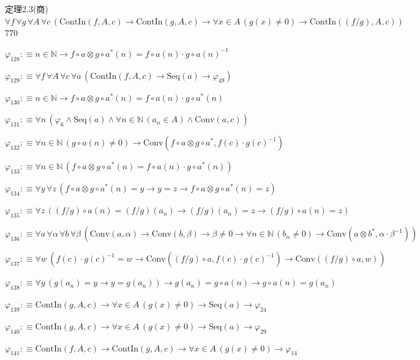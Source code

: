 \begin{fullproof}{定理2.3(商)}{$\forall f\,\forall g\,\forall A\,\forall c\,(\mathrm{ContIn}(f,A,c) \to \mathrm{ContIn}(g,A,c) \to \forall x \in A\,(g(x) \neq 0) \to \mathrm{ContIn}((f / g),A,c))$}{770}
\begin{abbrevlist}
\item $\varphi_{128} :\equiv n \in \mathbb{N} \to f \circ a \otimes g \circ a^{\ast}(n) = f \circ a(n) \cdot g \circ a(n)^{-1}$
\item $\varphi_{129} :\equiv \forall f\,\forall A\,\forall c\,\forall a\,(\mathrm{ContIn}(f,A,c) \to \mathrm{Seq}(a) \to \varphi_{49})$
\item $\varphi_{130} :\equiv n \in \mathbb{N} \to f \circ a \otimes g \circ a^{\ast}(n) = f \circ a(n) \cdot g \circ a^{\ast}(n)$
\item $\varphi_{131} :\equiv \forall n\,(\varphi_{6} \land \mathrm{Seq}(a) \land \forall n \in \mathbb{N}\,(a_{n} \in A) \land \mathrm{Conv}(a,c))$
\item $\varphi_{132} :\equiv \forall n \in \mathbb{N}\,(g \circ a(n) \neq 0) \to \mathrm{Conv}(f \circ a \otimes g \circ a^{\ast},f(c) \cdot g(c)^{-1})$
\item $\varphi_{133} :\equiv \forall n \in \mathbb{N}\,(f \circ a \otimes g \circ a^{\ast}(n) = f \circ a(n) \cdot g \circ a^{\ast}(n))$
\item $\varphi_{134} :\equiv \forall y\,\forall z\,(f \circ a \otimes g \circ a^{\ast}(n) = y \to y = z \to f \circ a \otimes g \circ a^{\ast}(n) = z)$
\item $\varphi_{135} :\equiv \forall z\,((f / g) \circ a(n) = (f / g)(a_{n}) \to (f / g)(a_{n}) = z \to (f / g) \circ a(n) = z)$
\item $\varphi_{136} :\equiv \forall a\,\forall \alpha\,\forall b\,\forall \beta\,(\mathrm{Conv}(a,\alpha) \to \mathrm{Conv}(b,\beta) \to \beta \neq 0 \to \forall n \in \mathbb{N}\,(b_{n} \neq 0) \to \mathrm{Conv}(a \otimes b^{\ast},\alpha \cdot \beta^{-1}))$
\item $\varphi_{137} :\equiv \forall w\,(f(c) \cdot g(c)^{-1} = w \to \mathrm{Conv}((f / g) \circ a,f(c) \cdot g(c)^{-1}) \to \mathrm{Conv}((f / g) \circ a,w))$
\item $\varphi_{138} :\equiv \forall y\,(g(a_{n}) = y \to y = g(a_{n})) \to g(a_{n}) = g \circ a(n) \to g \circ a(n) = g(a_{n})$
\item $\varphi_{139} :\equiv \mathrm{ContIn}(g,A,c) \to \forall x \in A\,(g(x) \neq 0) \to \mathrm{Seq}(a) \to \varphi_{24}$
\item $\varphi_{140} :\equiv \mathrm{ContIn}(g,A,c) \to \forall x \in A\,(g(x) \neq 0) \to \mathrm{Seq}(a) \to \varphi_{29}$
\item $\varphi_{141} :\equiv \mathrm{ContIn}(f,A,c) \to \mathrm{ContIn}(g,A,c) \to \forall x \in A\,(g(x) \neq 0) \to \varphi_{14}$

\end{abbrevlist}
\end{fullproof}
